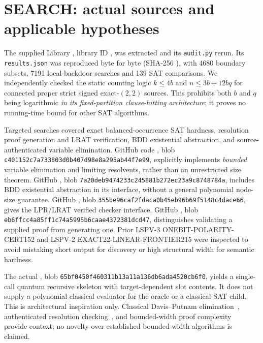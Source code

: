 \documentclass[11pt]{article}
\begin{document}
\section{SEARCH: actual sources and applicable hypotheses}
The supplied Library , library ID , was extracted and its \texttt{audit.py} rerun. Its \texttt{results.json} was reproduced byte for byte (SHA-256 ), with 4680 boundary subsets, 7191 local-backdoor searches and 139 SAT comparisons. We independently checked the static counting logic $k\le4b$ and $n\le3b+12bq$ for connected proper strict signed exact-$(2,2)$ sources. This prohibits both $b$ and $q$ being logarithmic \emph{in its fixed-partition clause-hitting architecture}; it proves no running-time bound for other SAT algorithms.

Targeted searches covered exact balanced-occurrence SAT hardness, resolution proof generation and LRAT verification, BDD existential abstraction, and source-authenticated variable elimination. GitHub code , blob \texttt{c401152c7a733803d0b407d98e8a295ab44f7e99}, explicitly implements \emph{bounded} variable elimination and limiting resolvents, rather than an unrestricted size theorem. GitHub , blob \texttt{7a20deb9474233c245881b272ec23a9c8748784a}, includes BDD existential abstraction in its interface, without a general polynomial node-size guarantee. GitHub , blob \texttt{355be96caf2fdaca0b45eb96b69f5148c4dace66}, gives the LPR/LRAT verified checker interface. GitHub , blob \texttt{eb6ffcc4a85ff1c74a5995b6caae4372381dcd47}, distinguishes validating a supplied proof from generating one. Prior LSPV-3 ONEBIT-POLARITY-CERT152 and LSPV-2 EXACT22-LINEAR-FRONTIER215 were inspected to avoid mistaking short output for discovery or high structural width for semantic hardness.

The actual , blob \texttt{65bf0450f460311b13a11a136db6ada4520cb6f0}, yields a single-call quantum recursive skeleton with target-dependent slot contents. It does not supply a polynomial classical evaluator for the oracle or a classical SAT child. This is architectural inspiration only. Classical Davis--Putnam elimination~\cite{davisputnam}, authenticated resolution checking~\cite{lrat}, and bounded-width proof complexity~\cite{atseriasdalmau} provide context; no novelty over established bounded-width algorithms is claimed.
\end{document}
